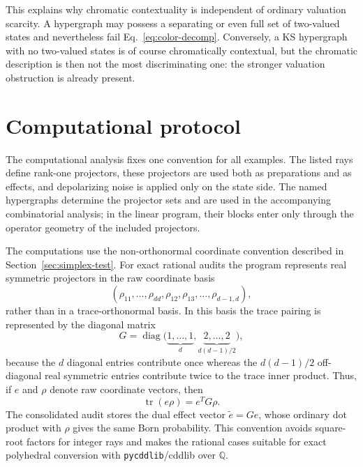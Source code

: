 \documentclass[aps,pra,twocolumn,superscriptaddress,nofootinbib]{revtex4-2}
\newcommand{\tr}{\operatorname{tr}}
\begin{document}
This explains why chromatic contextuality is independent of ordinary valuation scarcity.  A hypergraph may possess a separating or even full set of two-valued states and nevertheless fail Eq.~\eqref{eq:color-decomp}.  Conversely, a KS hypergraph with no two-valued states is of course chromatically contextual, but the chromatic description is then not the most discriminating one: the stronger valuation obstruction is already present.



\section{Computational protocol}

The computational analysis fixes one convention for all examples.  The listed
rays define rank-one projectors, these projectors are used both as preparations
and as effects, and depolarizing noise is applied only on the state side.  The
named hypergraphs determine the projector sets and are used in the accompanying
combinatorial analysis; in the linear program, their blocks enter only through the operator
geometry of the included projectors.


The computations use the non-orthonormal coordinate convention described in
Section~\ref{sec:simplex-test}.  For exact rational audits the program represents
real symmetric projectors in the raw coordinate basis
\begin{equation}
        (\rho_{11},\ldots,\rho_{dd},
        \rho_{12},\rho_{13},\ldots,\rho_{d-1,d}),
        \label{eq:raw-basis}
\end{equation}
rather than in a trace-orthonormal basis.  In this basis the trace pairing is
represented by the diagonal matrix
\begin{equation}
        G=\operatorname{diag}
        \Big(
        \underbrace{1,\ldots,1}_{d},
        \underbrace{2,\ldots,2}_{d(d-1)/2}
        \Big),
        \label{eq:raw-trace-metric}
\end{equation}
because the \(d\) diagonal entries contribute once whereas the \(d(d-1)/2\)
off-diagonal real symmetric entries contribute twice to the trace
inner product.  Thus, if $e$ and $\rho$ denote raw coordinate vectors, then
\begin{equation}
        \tr(e\rho)=e^T G\rho.
        \label{eq:raw-trace-pairing}
\end{equation}
The consolidated audit stores the dual effect vector $\widetilde e=Ge$, whose
ordinary dot product with $\rho$ gives the same Born probability.  This convention avoids
square-root factors for integer rays and makes the rational cases suitable for
exact polyhedral conversion with \texttt{pycddlib}/cddlib over $\mathbb Q$.
\end{document}
